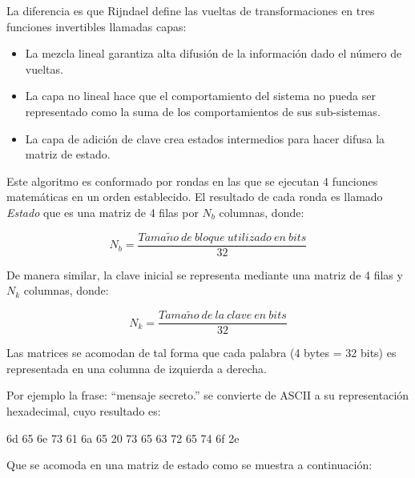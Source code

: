 \documentclass[../main/main.tex]{subfiles}
\begin{document}
    La diferencia es que Rijndael define las vueltas de transformaciones en tres funciones invertibles llamadas capas:

    \begin{itemize}[noitemsep,nolistsep]
      \item La mezcla lineal garantiza alta difusión de la información dado el número de vueltas.
      \item La capa no lineal hace que el comportamiento del sistema no pueda ser representado como la suma de los comportamientos de sus sub-sistemas.
      \item La capa de adición de clave crea estados intermedios para hacer difusa la matriz de estado.
    \end{itemize}

    Este algoritmo es conformado por rondas en las que se ejecutan 4 funciones matemáticas en un orden establecido. El resultado de cada ronda es llamado \textit{Estado} que es una matriz de 4 filas por $N_b$ columnas, donde:

    \vspace{-0.7cm}\begin{equation}
      N_b = \frac{Tama\tilde{n}o\ de\ bloque\ utilizado\ en\ bits}{32}
    \end{equation}

    De manera similar, la clave inicial se representa mediante una matriz de 4 filas y $N_k$ columnas, donde:

    \vspace{-0.7cm}\begin{equation}
      N_k = \frac{Tama\tilde{n}o\ de\ la\ clave\ en\ bits}{32}
    \end{equation}

    Las matrices se acomodan de tal forma que cada palabra (4 bytes = 32 bits) es representada en una columna de izquierda a derecha.

    Por ejemplo la frase: ``mensaje secreto.'' se convierte de ASCII a su representación hexadecimal, cuyo resultado es:

    \begin{center}
      6d 65 6e 73 61 6a 65 20 73 65 63 72 65 74 6f 2e
    \end{center}

    Que se acomoda en una matriz de estado como se muestra a continuación:

    \begin{table}[H]
      \centering
      
    \end{table}
\end{document}

